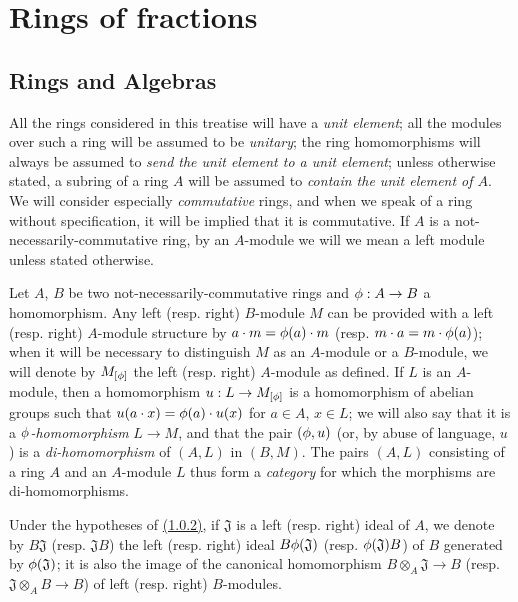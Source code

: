 \section{Rings of fractions}
\label{section-rings-of-fractions}

\setcounter{subsection}{-1}
\subsection{Rings and Algebras}
\label{subsection-rings-and-algs}

\begin{env}[1.0.1]
\label{0.1.0.1}
All the rings considered in this treatise will have a {\em unit element}; all
the modules over such a ring will be assumed to be {\em unitary}; the ring
homomorphisms will always be assumed to {\em send the unit element to a unit
element}; unless otherwise stated, a subring of a ring $A$ will be assumed to
{\em contain the unit element of $A$}. We will consider especially
{\em commutative} rings, and when we speak of a ring without specification, it
will be implied that it is commutative. If $A$ is a not-necessarily-commutative ring,
by an $A$-module we will we mean a left module unless stated otherwise.
\end{env}

\begin{env}[1.0.2]
\label{0.1.0.2}
Let $A$, $B$ be two not-necessarily-commutative rings and $\phi:A\to B$ a
homomorphism. Any left (resp. right) $B$-module $M$ can be provided with a left
(resp. right) $A$-module structure by $a\cdot m=\phi(a)\cdot m$
(resp. $m\cdot a=m\cdot\phi(a)$); when it will be necessary to distinguish $M$
as an $A$-module or a $B$-module, we will denote by $M_{[\phi]}$ the left
(resp. right) $A$-module as defined. If $L$ is an $A$-module, then a
homomorphism $u:L\to M_{[\phi]}$ is a homomorphism of abelian groups such
that $u(a\cdot x)=\phi(a)\cdot u(x)$ for $a\in A$, $x\in L$; we will also say
that it is a {\em $\phi$-homomorphism} $L\to M$, and that the pair $(\phi,u)$
(or, by abuse of language, $u$) is a {\em di-homomorphism} of $(A,L)$ in
$(B,M)$. The pairs $(A,L)$ consisting of a ring $A$ and an $A$-module $L$ thus
form a {\em category} for which the morphisms are di-homomorphisms.
\end{env}

\begin{env}[1.0.3]
\label{0.1.0.3}
Under the hypotheses of \hyperref[0.1.0.2]{(1.0.2)}, if $\mathfrak{J}$ is a left
(resp. right) ideal of $A$, we denote by $B\mathfrak{J}$ (resp. $\mathfrak{J}B$)
the left (resp. right) ideal $B\phi(\mathfrak{J})$
(resp. $\phi(\mathfrak{J})B$) of $B$ generated by $\phi(\mathfrak{J})$; it is
also the image of the canonical homomorphism $B\otimes_A\mathfrak{J}\to B$
(resp. $\mathfrak{J}\otimes_A B\to B$) of left (resp. right) $B$-modules.
\end{env}

